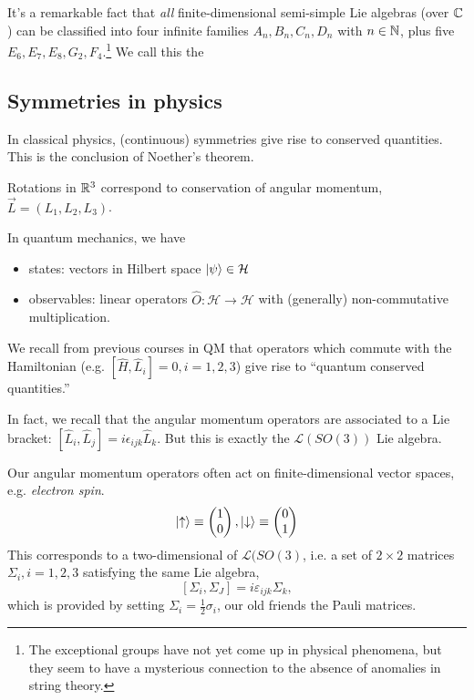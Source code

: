 It's a remarkable fact that \emph{all} finite-dimensional semi-simple Lie algebras (over $\mathbb{C}$) can be classified into four infinite families $A_n, B_n, C_n,D_n$ with $n\in \mathbb{N}$, plus five  $E_6,E_7,E_8,G_2,F_4$.\footnote{The exceptional groups have not yet come up in physical phenomena, but they seem to have a mysterious connection to the absence of anomalies in string theory.} We call this the 

\subsection*{Symmetries in physics}
In classical physics, (continuous) symmetries give rise to conserved quantities. This is the conclusion of Noether's theorem.
\begin{exm}
Rotations in $\mathbb{R}^3$ correspond to conservation of angular momentum, $\vec{L}=(L_1,L_2,L_3)$.
\end{exm}
In quantum mechanics, we have
\begin{itemize}
    \item states: vectors in Hilbert space $\left| \psi \right>\in \mathcal{H}$
    \item observables: linear operators $\hat O: \mathcal{H}\to\mathcal{H}$ with (generally) non-commutative multiplication.
\end{itemize}
We recall from previous courses in QM that operators which commute with the Hamiltonian (e.g. $[\hat H, \hat L_i]=0, i= 1,2,3$) give rise to ``quantum conserved quantities.''

In fact, we recall that the angular momentum operators are associated to a Lie bracket: $[\hat L_i, \hat L_j]=i \epsilon_{ijk} \hat L_k$. But this is exactly the $\mathcal{L}(SO(3))$ Lie algebra. 

Our angular momentum operators often act on finite-dimensional vector spaces, e.g. \emph{electron spin}.
$$\left| \uparrow \right>\equiv \begin{pmatrix}1\\0\end{pmatrix},\left| \downarrow \right>\equiv \begin{pmatrix}0\\1\end{pmatrix}$$
This corresponds to a two-dimensional  of $\mathcal{L}(SO(3)$, i.e. a set of $2\times 2$ matrices $\Sigma_i, i=1,2,3$ satisfying the same Lie algebra,
$$[\Sigma_i,\Sigma_J]=i\varepsilon_{ijk}\Sigma_k,$$
which is provided by setting $\Sigma_i=\frac{1}{2}\sigma_i$, our old friends the Pauli matrices.

